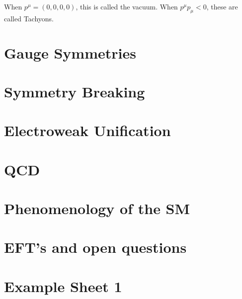 \documentclass[11pt, oneside]{article}   	%
\theoremstyle{slanted}
\begin{document}
When $ p ^ \mu  = \left( 0 , 0 , 0 , 0  \right)  $, 
this is called the vacuum. When $ p ^ \mu p _ \mu < 0  $, 
these are called Tachyons. 
\section{Gauge Symmetries}%
\label{sec:gauge_symmetries}

\section{Symmetry Breaking}%
\label{sec:symmetry_breaking}

\section{Electroweak Unification}%
\label{sec:electroweak_unification}

\section{QCD}%
\label{sec:qcd}

\section{Phenomenology of the SM}%
\label{sec:phenomenology_of_the_sm}

\section{EFT's and open questions}%
\label{sec:eft_s_and_open_questions}



\pagebreak 
\section*{Example Sheet 1}
\end{document}

